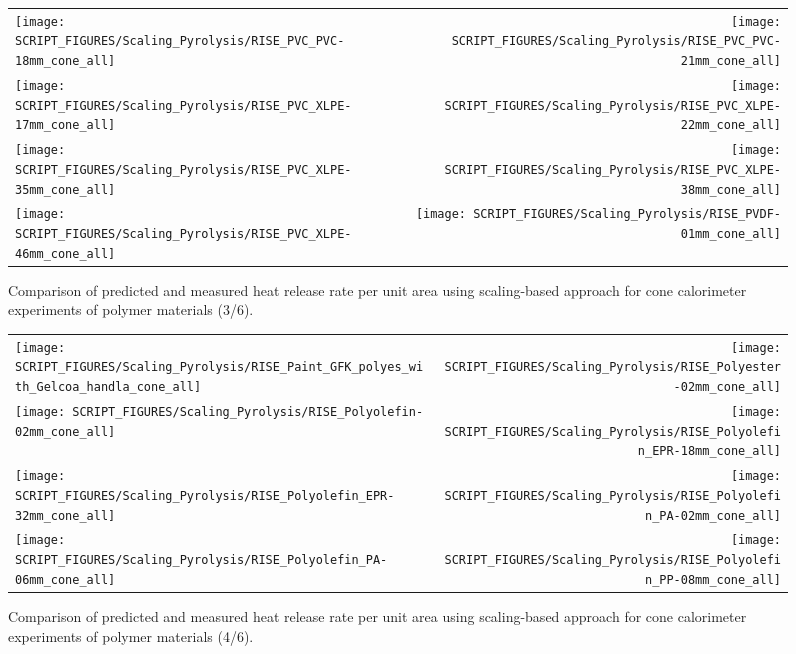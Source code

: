 \begin{figure}[!h]
\begin{tabular*}{\textwidth}{l@{\extracolsep{\fill}}r}
\texttt{[image: SCRIPT\_FIGURES/Scaling\_Pyrolysis/RISE\_PVC\_PVC-18mm\_cone\_all]} &
\texttt{[image: SCRIPT\_FIGURES/Scaling\_Pyrolysis/RISE\_PVC\_PVC-21mm\_cone\_all]} \\
\texttt{[image: SCRIPT\_FIGURES/Scaling\_Pyrolysis/RISE\_PVC\_XLPE-17mm\_cone\_all]} &
\texttt{[image: SCRIPT\_FIGURES/Scaling\_Pyrolysis/RISE\_PVC\_XLPE-22mm\_cone\_all]} \\
\texttt{[image: SCRIPT\_FIGURES/Scaling\_Pyrolysis/RISE\_PVC\_XLPE-35mm\_cone\_all]} &
\texttt{[image: SCRIPT\_FIGURES/Scaling\_Pyrolysis/RISE\_PVC\_XLPE-38mm\_cone\_all]} \\
\texttt{[image: SCRIPT\_FIGURES/Scaling\_Pyrolysis/RISE\_PVC\_XLPE-46mm\_cone\_all]} &
\texttt{[image: SCRIPT\_FIGURES/Scaling\_Pyrolysis/RISE\_PVDF-01mm\_cone\_all]} \\
\end{tabular*}
\caption[HRRPUA of RISE materials using scaling model, polymer materials]
{Comparison of predicted and measured heat release rate per unit area using scaling-based approach for cone calorimeter experiments of polymer materials (3/6).}
\label{RISE_Materials_polymers3}
\end{figure}

\begin{figure}[!h]
\begin{tabular*}{\textwidth}{l@{\extracolsep{\fill}}r}
\texttt{[image: SCRIPT\_FIGURES/Scaling\_Pyrolysis/RISE\_Paint\_GFK\_polyes\_with\_Gelcoa\_handla\_cone\_all]} &
\texttt{[image: SCRIPT\_FIGURES/Scaling\_Pyrolysis/RISE\_Polyester-02mm\_cone\_all]} \\
\texttt{[image: SCRIPT\_FIGURES/Scaling\_Pyrolysis/RISE\_Polyolefin-02mm\_cone\_all]} &
\texttt{[image: SCRIPT\_FIGURES/Scaling\_Pyrolysis/RISE\_Polyolefin\_EPR-18mm\_cone\_all]} \\
\texttt{[image: SCRIPT\_FIGURES/Scaling\_Pyrolysis/RISE\_Polyolefin\_EPR-32mm\_cone\_all]} &
\texttt{[image: SCRIPT\_FIGURES/Scaling\_Pyrolysis/RISE\_Polyolefin\_PA-02mm\_cone\_all]} \\
\texttt{[image: SCRIPT\_FIGURES/Scaling\_Pyrolysis/RISE\_Polyolefin\_PA-06mm\_cone\_all]} &
\texttt{[image: SCRIPT\_FIGURES/Scaling\_Pyrolysis/RISE\_Polyolefin\_PP-08mm\_cone\_all]} \\
\end{tabular*}
\caption[HRRPUA of RISE materials using scaling model, polymer materials]
{Comparison of predicted and measured heat release rate per unit area using scaling-based approach for cone calorimeter experiments of polymer materials (4/6).}
\label{RISE_Materials_polymers4}
\end{figure}

